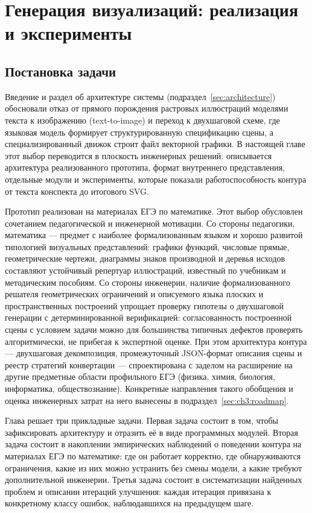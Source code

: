 \section{Генерация визуализаций: реализация и эксперименты}
\label{sec:chapter3}

\subsection{Постановка задачи}
\label{sec:ch3:setup}

Введение и раздел об архитектуре системы (подраздел~\ref{sec:architecture}) обосновали отказ от прямого порождения растровых иллюстраций моделями текста к изображению (text-to-image) и переход к двухшаговой схеме, где языковая модель формирует структурированную спецификацию сцены, а специализированный движок строит файл векторной графики. В настоящей главе этот выбор переводится в плоскость инженерных решений: описывается архитектура реализованного прототипа, формат внутреннего представления, отдельные модули и эксперименты, которые показали работоспособность контура от текста конспекта до итогового SVG.

Прототип реализован на материалах ЕГЭ по математике. Этот выбор обусловлен сочетанием педагогической и инженерной мотивации. Со стороны педагогики, математика --- предмет с наиболее формализованным языком и хорошо развитой типологией визуальных представлений: графики функций, числовые прямые, геометрические чертежи, диаграммы знаков производной и деревья исходов составляют устойчивый репертуар иллюстраций, известный по учебникам и методическим пособиям. Со стороны инженерии, наличие формализованного решателя геометрических ограничений и описуемого языка плоских и пространственных построений упрощает проверку гипотезы о двухшаговой генерации с детерминированной верификацией: согласованность построенной сцены с условием задачи можно для большинства типичных дефектов проверять алгоритмически, не прибегая к экспертной оценке. При этом архитектура контура --- двухшаговая декомпозиция, промежуточный JSON\nobreakdash-формат описания сцены и реестр стратегий конвертации --- спроектирована с заделом на расширение на другие предметные области профильного ЕГЭ (физика, химия, биология, информатика, обществознание). Конкретные направления такого обобщения и оценка инженерных затрат на него вынесены в подраздел~\ref{sec:ch3:roadmap}.

Глава решает три прикладные задачи. Первая задача состоит в том, чтобы зафиксировать архитектуру и отразить её в виде программных модулей. Вторая задача состоит в накоплении эмпирических наблюдений о поведении контура на материалах ЕГЭ по математике: где он работает корректно, где обнаруживаются ограничения, какие из них можно устранить без смены модели, а какие требуют дополнительной инженерии. Третья задача состоит в систематизации найденных проблем и описании итераций улучшения: каждая итерация привязана к конкретному классу ошибок, наблюдавшихся на предыдущем шаге.

